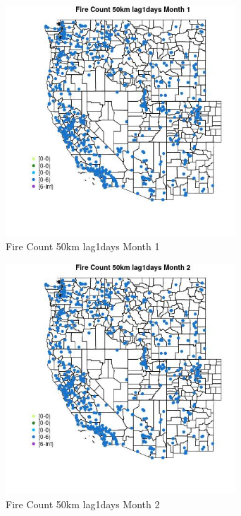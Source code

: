 \begin{figure} 
\centering  
\includegraphics[width=0.77\textwidth]{Code_Outputs/Report_ML_input_PM25_Step4_part_e_de_duplicated_aves_compiled_2019-05-21wNAs_MapObsMo1Fire_Count_50km_lag1days.jpg} 
\caption{\label{fig:Report_ML_input_PM25_Step4_part_e_de_duplicated_aves_compiled_2019-05-21wNAsMapObsMo1Fire_Count_50km_lag1days}Fire Count 50km lag1days Month 1} 
\end{figure} 
 

\begin{figure} 
\centering  
\includegraphics[width=0.77\textwidth]{Code_Outputs/Report_ML_input_PM25_Step4_part_e_de_duplicated_aves_compiled_2019-05-21wNAs_MapObsMo2Fire_Count_50km_lag1days.jpg} 
\caption{\label{fig:Report_ML_input_PM25_Step4_part_e_de_duplicated_aves_compiled_2019-05-21wNAsMapObsMo2Fire_Count_50km_lag1days}Fire Count 50km lag1days Month 2} 
\end{figure} 
 

